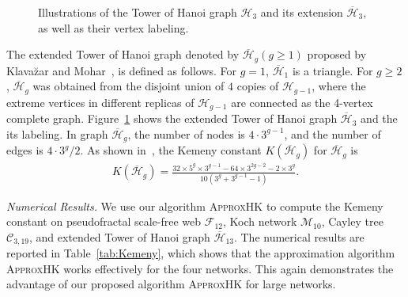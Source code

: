 \documentclass[10pt,twocolumn,twoside]{IEEEtran}
\begin{document}
\begin{figure}[!t]
{\begin{minipage}[t]{0.5\linewidth}
            \label{exSierpinski}
        \end{minipage}%
    }%
    \centering
    \caption{Illustrations of the Tower of Hanoi graph \(\mathcal{H}_{3}\) and its extension \(\overline{\mathcal{H}}_{3}\), as well as  their vertex labeling.}
\end{figure}

The extended  Tower of Hanoi graph denoted by \(\overline{\mathcal{H}}_{g}(g\ge 1)\)  proposed by Klava\u zar and Mohar~\cite{KlMo05,ZhWuLiCo16,QiDoZhZh20}, is defined as follows. For \(g=1\), \(\overline{\mathcal{H}}_{1}\) is a triangle. For \(g\ge2\),  \(\overline{\mathcal{H}}_{g}\) was obtained from the disjoint union of \(4\) copies of \(\mathcal{H}_{g-1}\), where the extreme vertices in different  replicas of \(\mathcal{H}_{g-1}\) are connected as the 4-vertex complete graph. Figure~\ref{exSierpinski} shows the extended  Tower of Hanoi graph \(\overline{\mathcal{H}}_{3}\) and the its labeling. In graph \(\overline{\mathcal{H}}_{g}\), the number of nodes is \(4\cdot3^{g-1}\), and the number of edges is \(4\cdot3^g/2\). As shown in~\cite{QiZh18}, the Kemeny constant \(K(\overline{\mathcal{H}}_{g})\) for \(\overline{\mathcal{H}}_{g}\) is
\begin{align}
    K(\overline{\mathcal{H}}_{g}) = \frac{32\times5^g\times3^{g-1}-64\times3^{2g-2}-2\times3^g}{10(3^g+3^{g-1}-1)}.
    \label{Kg04}
\end{align}

\textit{Numerical Results.} We use our algorithm \textsc{ApproxHK} to compute the Kemeny constant on   pseudofractal scale-free web \(\mathcal{F}_{12}\),  Koch network \(\mathcal{M}_{10}\),   Cayley tree \(\mathcal{C}_{3,19}\), and   extended  Tower of Hanoi graph \(\overline{\mathcal{H}}_{13}\). The numerical results are reported in  Table~\ref{tab:Kemeny}, which shows that the approximation algorithm \textsc{ApproxHK} works effectively for the four networks. This again demonstrates the advantage of our proposed algorithm  \textsc{ApproxHK} for large networks.
\end{document}

